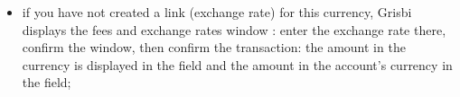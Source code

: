 \begin{itemize}
	\item if you have not created a link (exchange rate) for this currency, Grisbi displays the fees and exchange rates window : enter the exchange rate there, confirm the window, then confirm the transaction: the amount in the currency is displayed in the  field and the amount in the account’s currency in the  field;
	 

\end{itemize}
